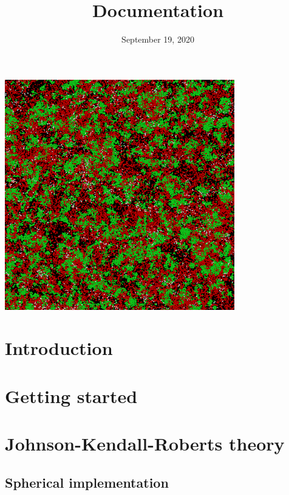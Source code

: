 \documentclass{article}
\begin{document}
    \title{\vspace{0mm}\textbf{Documentation}}
    \date{\vspace{-10mm}September 19, 2020}
    \maketitle



\begin{center}
    \includegraphics[width=10cm]{../images/front_page.png}
\end{center}

\newpage

\tableofcontents

\newpage

    \section{Introduction}\label{sec:introduction}


    \section{Getting started}\label{sec:getting-started}


    \section{Johnson-Kendall-Roberts theory}\label{sec:jkr}

    \subsection{Spherical implementation}\label{subsec:spherical-implementation}
\end{document}
